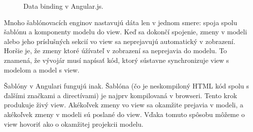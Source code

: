 \begin{figure}[H]
\caption{Data binding v Angular.js.}
\end{figure}

Mnoho šablónovacích enginov nastavujú dáta len v jednom smere: spoja spolu šablónu a komponenty modelu do view. Keď sa dokončí spojenie, zmeny v modeli alebo jeho príslušných sekcií vo view sa neprejavujú automatický v zobrazení. Horšie je, že zmeny ktoré úžívateľ v zobrazení sa neprejavia do modelu. To znamená, že vývojár musí napísať kód, ktorý sústavne synchronizuje view s modelom a model s view.

Šablóny v Angulari fungujú inak. Šablóna (čo je neskompiloný HTML kód spolu s ďalšími značkami a directívami) je najprv kompilovaná v browseri. Tento krok produkuje živý view. Akékoľvek zmeny vo view sa okamžite prejavia v modeli, a akékoľvek zmeny v modeli sú poslané do view. Vďaka tomuto spôsobu môžeme o view hovoriť ako o okamžitej projekcii modelu.

